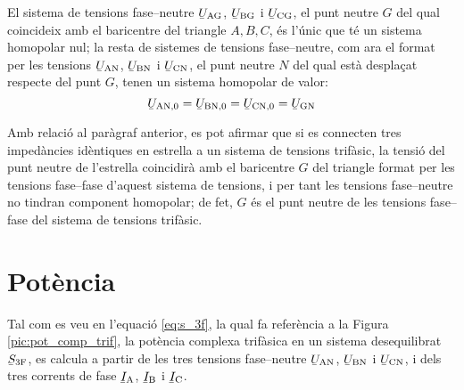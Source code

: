 El sistema de tensions fase--neutre
$\cmplx{U}\ped{AG}$, $\cmplx{U}\ped{BG}$ i $\cmplx{U}\ped{CG}$,
el punt neutre $G$ del qual coincideix amb el baricentre del
triangle $A, B,
 C$, és l'únic que té un sistema homopolar nul; la resta de sistemes de tensions
 fase--neutre, com ara el format per les tensions $\cmplx{U}\ped{AN}$, $\cmplx{U}\ped{BN}$ i $\cmplx{U}\ped{CN}$,
 el punt neutre $N$ del qual està desplaçat respecte del punt $G$, tenen un sistema
 homopolar de valor:
\begin{equation}
    \cmplx{U}\ped{AN,0} = \cmplx{U}\ped{BN,0} =
    \cmplx{U}\ped{CN,0} = \cmplx{U}\ped{GN}
\end{equation}

Amb relació al paràgraf anterior, es pot afirmar que si es
connecten tres impedàncies idèntiques en estrella a un sistema
de tensions trifàsic, la tensió del punt neutre de l'estrella
coincidirà amb el baricentre $G$ del triangle format per les tensions
fase--fase d'aquest sistema de tensions, i per tant les tensions fase--neutre no tindran
component homopolar; de fet, $G$ és el punt neutre de les tensions
fase--fase del sistema de tensions trifàsic.

\section{Potència} 

Tal com es veu en l'equació \eqref{eq:s_3f}, la qual fa referència a
la Figura \vref{pic:pot_comp_trif}, la potència complexa trifàsica
en un sistema desequilibrat $\cmplx{S}\ped{3F}$, es calcula a partir
de les tres tensions fase--neutre $\cmplx{U}\ped{AN}$,
$\cmplx{U}\ped{BN}$ i $\cmplx{U}\ped{CN}$, i dels tres
corrents de fase $\cmplx{I}\ped{A}$, $\cmplx{I}\ped{B}$ i
$\cmplx{I}\ped{C}$.


